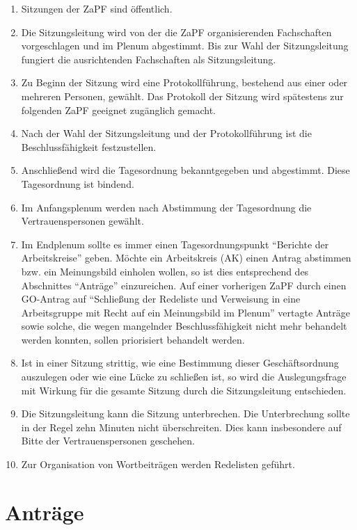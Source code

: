 \documentclass[
  ngerman,
  a4paper,
  oneside]{scrartcl}
\providecommand{\tightlist}{%
  \setlength{\itemsep}{0pt}\setlength{\parskip}{0pt}}
\begin{document}
\begin{enumerate}
\def\labelenumi{\arabic{enumi}.}
\tightlist
\item
  Sitzungen der ZaPF sind öffentlich.
\item
  Die Sitzungsleitung wird von der die ZaPF organisierenden Fachschaften
  vorgeschlagen und im Plenum abgestimmt. Bis zur Wahl der
  Sitzungsleitung fungiert die ausrichtenden Fachschaften als
  Sitzungsleitung.
\item
  Zu Beginn der Sitzung wird eine Protokollführung, bestehend aus einer
  oder mehreren Personen, gewählt. Das Protokoll der Sitzung wird
  spätestens zur folgenden ZaPF geeignet zugänglich gemacht.
\item
  Nach der Wahl der Sitzungsleitung und der Protokollführung ist die
  Beschlussfähigkeit festzustellen.
\item
  Anschließend wird die Tagesordnung bekanntgegeben und abgestimmt.
  Diese Tagesordnung ist bindend.
\item
  Im Anfangsplenum werden nach Abstimmung der Tagesordnung die
  Vertrauenspersonen gewählt.
\item
  Im Endplenum sollte es immer einen Tagesordnungspunkt ``Berichte der
  Arbeitskreise'' geben. Möchte ein Arbeitskreis (AK) einen Antrag
  abstimmen bzw. ein Meinungsbild einholen wollen, so ist dies
  entsprechend des Abschnittes ``Anträge'' einzureichen. Auf einer
  vorherigen ZaPF durch einen GO-Antrag auf ``Schließung der Redeliste
  und Verweisung in eine Arbeitsgruppe mit Recht auf ein Meinungsbild im
  Plenum'' vertagte Anträge sowie solche, die wegen mangelnder
  Beschlussfähigkeit nicht mehr behandelt werden konnten, sollen
  priorisiert behandelt werden.
\item
  Ist in einer Sitzung strittig, wie eine Bestimmung dieser
  Geschäftsordnung auszulegen oder wie eine Lücke zu schließen ist, so
  wird die Auslegungsfrage mit Wirkung für die gesamte Sitzung durch die
  Sitzungsleitung entschieden.
\item
  Die Sitzungsleitung kann die Sitzung unterbrechen. Die Unterbrechung
  sollte in der Regel zehn Minuten nicht überschreiten. Dies kann
  insbesondere auf Bitte der Vertrauenspersonen geschehen.
\item
  Zur Organisation von Wortbeiträgen werden Redelisten geführt.
\end{enumerate}

\section{Anträge}\label{antruxe4ge}
\end{document}
